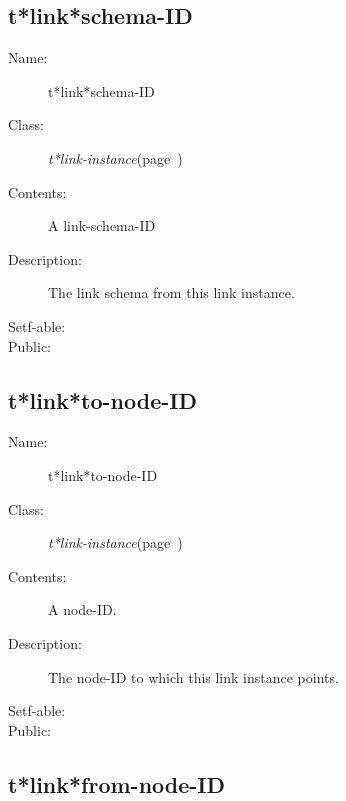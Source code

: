 \subsection{t*link*schema-ID}
\label{t*link*schema-ID}

\begin{description}
\item [Name:]  t*link*schema-ID

\item [Class:] {\sl t*link-instance}\hfill(page~\pageref{t*link-instance})

\item [Contents:]
A link-schema-ID

\item [Description:]

The link schema from this link instance.

\item [Setf-able:]


\item [Public:]



\end{description}
\horizontalline

\subsection{t*link*to-node-ID}
\label{t*link*to-node-ID}

\begin{description}
\item [Name:]  t*link*to-node-ID

\item [Class:] {\sl t*link-instance}\hfill(page~\pageref{t*link-instance})

\item [Contents:]
A node-ID.

\item [Description:]

The node-ID to which this link instance points. 

\item [Setf-able:]


\item [Public:]



\end{description}
\horizontalline

\subsection{t*link*from-node-ID}
\label{t*link*from-node-ID}

